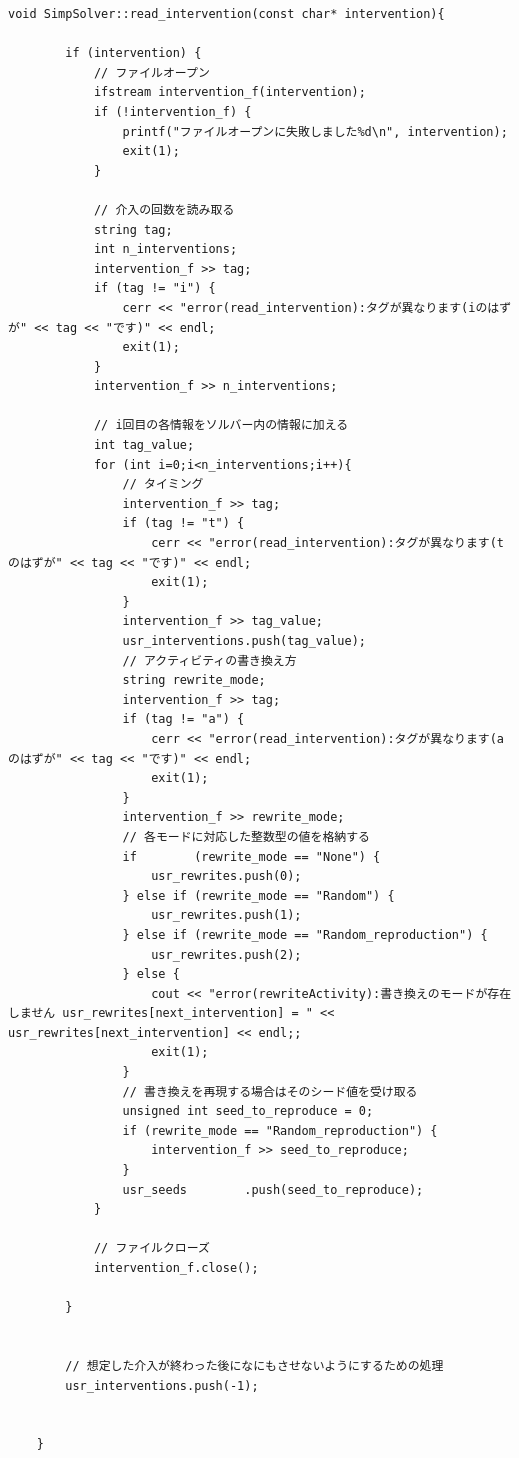 \begin{lstlisting}[caption=関数read\_intervention(core/Solver.cc)]
	void SimpSolver::read_intervention(const char* intervention){

    	if (intervention) {
        	// ファイルオープン
        	ifstream intervention_f(intervention);
        	if (!intervention_f) {
            	printf("ファイルオープンに失敗しました%d\n", intervention);
            	exit(1);
        	}

        	// 介入の回数を読み取る
        	string tag;
        	int n_interventions;
        	intervention_f >> tag;
        	if (tag != "i") {
        	    cerr << "error(read_intervention):タグが異なります(iのはずが" << tag << "です)" << endl;
        	    exit(1);
        	}
        	intervention_f >> n_interventions;

        	// i回目の各情報をソルバー内の情報に加える
        	int tag_value;
        	for (int i=0;i<n_interventions;i++){
            	// タイミング
            	intervention_f >> tag;
            	if (tag != "t") {
                	cerr << "error(read_intervention):タグが異なります(tのはずが" << tag << "です)" << endl;
                	exit(1);
            	}
            	intervention_f >> tag_value;
            	usr_interventions.push(tag_value);
            	// アクティビティの書き換え方
            	string rewrite_mode;
            	intervention_f >> tag;
            	if (tag != "a") {
                	cerr << "error(read_intervention):タグが異なります(aのはずが" << tag << "です)" << endl;
                	exit(1);
            	}
            	intervention_f >> rewrite_mode;
				// 各モードに対応した整数型の値を格納する
            	if        (rewrite_mode == "None") {
            	    usr_rewrites.push(0);
            	} else if (rewrite_mode == "Random") {
            	    usr_rewrites.push(1);
            	} else if (rewrite_mode == "Random_reproduction") {
            	    usr_rewrites.push(2);
            	} else {
            	    cout << "error(rewriteActivity):書き換えのモードが存在しません usr_rewrites[next_intervention] = " << usr_rewrites[next_intervention] << endl;;
            	    exit(1);
            	}
				// 書き換えを再現する場合はそのシード値を受け取る
            	unsigned int seed_to_reproduce = 0;
            	if (rewrite_mode == "Random_reproduction") {
            	    intervention_f >> seed_to_reproduce;
            	}
            	usr_seeds        .push(seed_to_reproduce);
        	}

        	// ファイルクローズ
        	intervention_f.close();

    	}


    	// 想定した介入が終わった後になにもさせないようにするための処理
    	usr_interventions.push(-1);


	}
\end{lstlisting}


